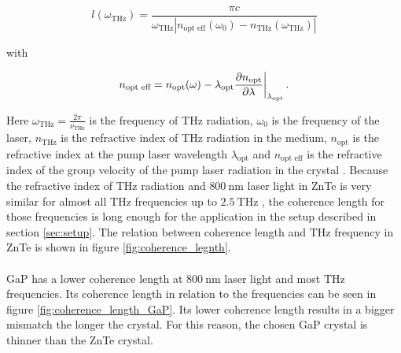 \begin{equation}
    l(\omega_{\si{\tera\hertz}}) = \frac{\pi c}{\omega_{\si{\tera\hertz}} \left | n_\text{opt eff}(\omega_0) - n_{\si{\tera\hertz}}(\omega_{\si{\tera\hertz}})\right |}
\end{equation}

with 

\begin{equation}
    n_{\text{opt eff}} = n_\text{opt}(\omega) - \lambda_\text{opt}\frac{\partial n_\text{opt}}{\partial \lambda}\biggl{|}_{\lambda_\text{opt}} \, .  
\end{equation}

Here $\omega_{\si{\tera\hertz}} = \frac{2\pi}{\nu_{\si{\tera\hertz}}}$ is the frequency of $\si{\tera\hertz}$ radiation, $\omega_0$ is the frequency of the laser, $n_{\si{\tera\hertz}}$ is the refractive index of $\si{\tera\hertz}$ radiation in the medium, $n_\text{opt}$ is the refractive index at the pump laser wavelength $\lambda_\text{opt}$ and $n_\text{opt eff}$ is the refractive index of the group velocity of the pump laser radiation in the crystal \cite{coherence_legnth}.
Because the refractive index of $\si{\tera\hertz}$ radiation and $\SI{800}{\nano\meter}$ laser light in ZnTe is very similar for almost all $\si{\tera\hertz}$ frequencies up to $\SI{2.5}{\tera\hertz}$ \cite{coherence_legnth}, the coherence length for those frequencies is long enough for the application in the setup described in section \ref{sec:setup}.
The relation between coherence length and $\si{\tera\hertz}$ frequency in ZnTe is shown in figure \ref{fig:coherence_legnth}.
\\\\
GaP has a lower coherence length at $\SI{800}{\nano\meter}$ laser light and most $\si{\tera\hertz}$ frequencies.
Its coherence length in relation to the frequencies can be seen in figure \ref{fig:coherence_length_GaP}.
Its lower coherence length results in a bigger mismatch the longer the crystal.
For this reason, the chosen GaP crystal is thinner than the ZnTe crystal.
